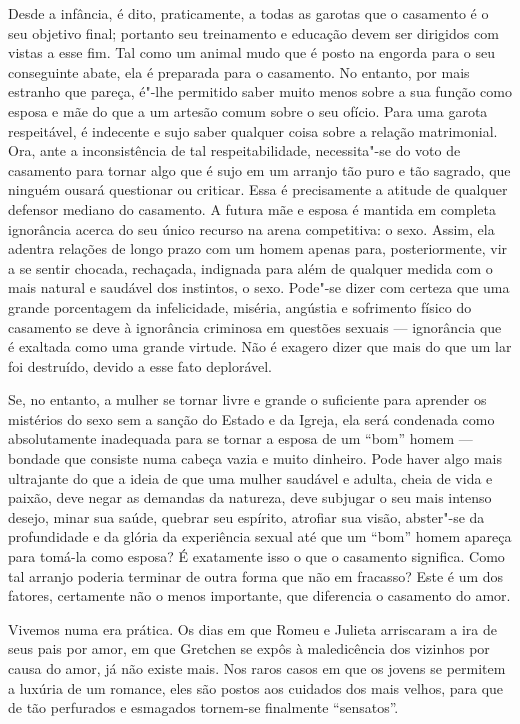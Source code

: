 Desde a infância, é dito, praticamente, a todas as garotas que o
casamento é o seu objetivo final; portanto seu treinamento e educação
devem ser dirigidos com vistas a esse fim. Tal como um animal mudo que é
posto na engorda para o seu conseguinte abate, ela é preparada para o
casamento. No entanto, por mais estranho que pareça, é"-lhe permitido
saber muito menos sobre a sua função como esposa e mãe do que a um
artesão comum sobre o seu ofício. Para uma garota respeitável, é
indecente e sujo saber qualquer coisa sobre a relação matrimonial. Ora,
ante a inconsistência de tal respeitabilidade, necessita"-se do voto
de casamento para tornar algo que é sujo em um arranjo tão puro e tão
sagrado, que ninguém ousará questionar ou criticar.
Essa é precisamente a atitude de qualquer defensor mediano do
casamento. A futura mãe e esposa é mantida em completa ignorância acerca do seu
único recurso na arena competitiva: o sexo. Assim, ela adentra relações
de longo prazo com um homem apenas para, posteriormente, vir a se sentir
chocada, rechaçada, indignada para além de qualquer medida com o mais
natural e saudável dos instintos, o sexo. Pode"-se dizer com certeza que
uma grande porcentagem da infelicidade, miséria, angústia e sofrimento
físico do casamento se deve à ignorância criminosa em questões sexuais
--- ignorância que é exaltada como uma grande virtude. Não é exagero
dizer que mais do que um lar foi destruído, devido a esse fato
deplorável.

Se, no entanto, a mulher se tornar livre e grande o suficiente para
aprender os mistérios do sexo sem a sanção do Estado e da Igreja, ela
será condenada como absolutamente inadequada para se tornar a esposa de
um ``bom'' homem --- bondade que consiste numa cabeça vazia e muito
dinheiro. Pode haver algo mais ultrajante do que a ideia de que uma
mulher saudável e adulta, cheia de vida e paixão, deve negar as demandas
da natureza, deve subjugar o seu mais intenso desejo, minar sua saúde,
quebrar seu espírito, atrofiar sua visão, abster"-se da profundidade
e da glória da experiência sexual até que um ``bom'' homem apareça
para tomá-la como esposa? É exatamente isso o que o casamento significa.
Como tal arranjo poderia terminar de outra forma que não em fracasso?
Este é um dos fatores, certamente não o menos importante, que
diferencia o casamento do amor.

Vivemos numa era prática. Os dias em que Romeu e Julieta arriscaram a
ira de seus pais por amor, em que Gretchen se expôs à maledicência dos
vizinhos por causa do amor, já não existe mais. Nos raros casos em que
os jovens se permitem a luxúria de um romance, eles são postos aos cuidados dos mais velhos, para que de tão perfurados e esmagados tornem-se finalmente ``sensatos''.

